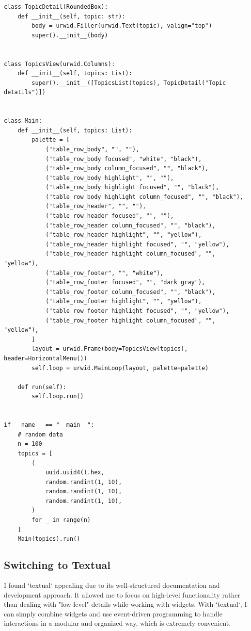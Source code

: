 \documentclass[10pt , a4paper]{report}
\newenvironment{code}{\captionsetup{type=listing}}{}
\begin{document}
\begin{code}
\begin{verbatim}
class TopicDetail(RoundedBox):
    def __init__(self, topic: str):
        body = urwid.Filler(urwid.Text(topic), valign="top")
        super().__init__(body)


class TopicsView(urwid.Columns):
    def __init__(self, topics: List):
        super().__init__([TopicsList(topics), TopicDetail("Topic detatils")])


class Main:
    def __init__(self, topics: List):
        palette = [
            ("table_row_body", "", ""),
            ("table_row_body focused", "white", "black"),
            ("table_row_body column_focused", "", "black"),
            ("table_row_body highlight", "", ""),
            ("table_row_body highlight focused", "", "black"),
            ("table_row_body highlight column_focused", "", "black"),
            ("table_row_header", "", ""),
            ("table_row_header focused", "", ""),
            ("table_row_header column_focused", "", "black"),
            ("table_row_header highlight", "", "yellow"),
            ("table_row_header highlight focused", "", "yellow"),
            ("table_row_header highlight column_focused", "", "yellow"),
            ("table_row_footer", "", "white"),
            ("table_row_footer focused", "", "dark gray"),
            ("table_row_footer column_focused", "", "black"),
            ("table_row_footer highlight", "", "yellow"),
            ("table_row_footer highlight focused", "", "yellow"),
            ("table_row_footer highlight column_focused", "", "yellow"),
        ]
        layout = urwid.Frame(body=TopicsView(topics), header=HorizontalMenu())
        self.loop = urwid.MainLoop(layout, palette=palette)

    def run(self):
        self.loop.run()


if __name__ == "__main__":
    # random data
    n = 100
    topics = [
        (
            uuid.uuid4().hex,
            random.randint(1, 10),
            random.randint(1, 10),
            random.randint(1, 10),
        )
        for _ in range(n)
    ]
    Main(topics).run()
  \end{verbatim}
\end{code}

\newpage
\subsection{Switching to Textual}

I found `textual` appealing due to its well-structured documentation and development approach. It allowed me to focus on high-level functionality rather than dealing with "low-level" details while working with widgets. With `textual`, I can simply combine widgets and use event-driven programming to handle interactions in a modular and organized way, which is extremely convenient.
\end{document}
